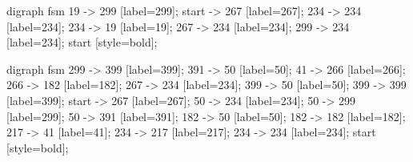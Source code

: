 \documentclass{article}
\begin{document}
digraph fsm {
	19 -> 299 [label=299];
	start -> 267 [label=267];
	234 -> 234 [label=234];
	234 -> 19 [label=19];
	267 -> 234 [label=234];
	299 -> 234 [label=234];
	start [style=bold];
}

digraph fsm {
	299 -> 399 [label=399];
	391 -> 50 [label=50];
	41 -> 266 [label=266];
	266 -> 182 [label=182];
	267 -> 234 [label=234];
	399 -> 50 [label=50];
	399 -> 399 [label=399];
	start -> 267 [label=267];
	50 -> 234 [label=234];
	50 -> 299 [label=299];
	50 -> 391 [label=391];
	182 -> 50 [label=50];
	182 -> 182 [label=182];
	217 -> 41 [label=41];
	234 -> 217 [label=217];
	234 -> 234 [label=234];
	start [style=bold];
}



\end{document}

